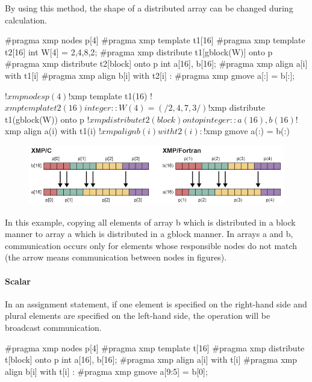 By using this method, the shape of a distributed array can be changed
during calculation.

\begin{XCexample}
#pragma xmp nodes p[4]
#pragma xmp template t1[16]
#pragma xmp template t2[16]
int W[4] = {2,4,8,2};
#pragma xmp distribute t1[gblock(W)] onto p
#pragma xmp distribute t2[block] onto p
int a[16], b[16];
#pragma xmp align a[i] with t1[i]
#pragma xmp align b[i] with t2[i]
     :
#pragma xmp gmove
  a[:] = b[:];
\end{XCexample}

\begin{XFexample}
!$xmp nodes p(4)
!$xmp template t1(16)
!$xmp template t2(16)
integer :: W(4) = (/2,4,7,3/)
!$xmp distribute t1(gblock(W)) onto p
!$xmp distribute t2(block) onto p
integer :: a(16), b(16)
!$xmp align a(i) with t1(i)
!$xmp align b(i) with t2(i)
     :
!$xmp gmove
  a(:) = b(:)
\end{XFexample}

\begin{figure}
  \centering
  \includegraphics{figs/gmove_change.png}
\end{figure}

In this example, copying all elements of array b which is distributed in
a block manner to array a which is distributed in a gblock manner. In
arrays a and b, communication occurs only for elements whose responsible
nodes do not match (the arrow means communication between nodes in
figures).

\paragraph{Scalar}

In an assignment statement, if one element is specified on the
right-hand side and plural elements are specified on the left-hand side,
the operation will be broadcast communication.

\begin{XCexample}
#pragma xmp nodes p[4]
#pragma xmp template t[16]
#pragma xmp distribute t[block] onto p
int a[16], b[16];
#pragma xmp align a[i] with t[i]
#pragma xmp align b[i] with t[i]
     :
#pragma xmp gmove
  a[9:5] = b[0];
\end{XCexample}

